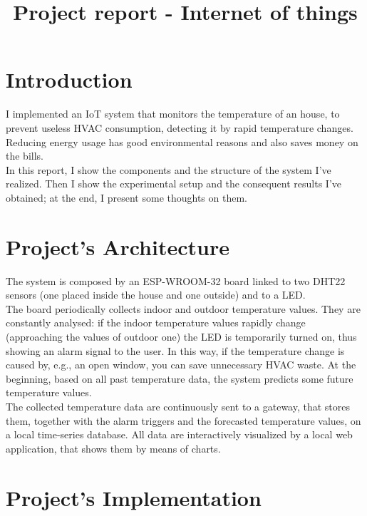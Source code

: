 \documentclass[conference]{IEEEtran}
\begin{document}
\title{Project report - Internet of things}

\author{
}

\maketitle


\section{Introduction}
I implemented an IoT system that monitors the temperature of an house, to prevent useless HVAC consumption, detecting it by rapid temperature changes. Reducing energy usage has good environmental reasons and also saves money on the bills.\\
In this report, I show the components and the structure of the system I've realized. Then I show the experimental setup and the consequent results I've obtained; at the end, I present some thoughts on them.


\section{Project’s Architecture}
The system is composed by an ESP-WROOM-32 board linked to two DHT22 sensors (one placed inside the house and one outside) and to a LED.\\
The board periodically collects indoor and outdoor temperature values. They are constantly analysed: if the indoor temperature values rapidly change (approaching the values of outdoor one) the LED is temporarily turned on, thus showing an alarm signal to the user. In this way, if the temperature change is caused by, e.g., an open window, you can save unnecessary HVAC waste. At the beginning, based on all past temperature data, the system predicts some future temperature values.\\
The collected temperature data are continuously sent to a gateway, that stores them, together with the alarm triggers and the forecasted temperature values, on a local time-series database. All data are interactively visualized by a local web application, that shows them by means of charts.


\section{Project’s Implementation}
\end{document}
